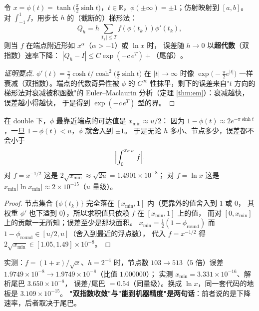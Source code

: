\begin{theorem}[双指数变换]
\label{thm:de}
令 $x=\phi(t)=\tanh\bigl(\tfrac\pi2\sinh t\bigr)$，$t\in\mathbb{R}$，$\phi(\pm\infty)=\pm1$；仿射映射到 $[a,b]$。
对 $\int_{-1}^1f$，用步长 $h$ 的（截断的）梯形法：
\[
  Q_h=h\sum_{|t_k|\le T}f(\phi(t_k))\phi'(t_k),
\]
则当 $f$ 在端点附近形如 $x^\alpha$（$\alpha>-1$）或 $\ln x$ 时，
误差随 $h\to0$ 以\textbf{超代数}（双指数）速率下降：
$|Q_h-I|\le C\exp(-c\,e^{T})+\text{（尾部）}$。
\end{theorem}

\begin{proof}[证明要点]
$\phi'(t)=\tfrac\pi2\cosh t/\cosh^2\bigl(\tfrac\pi2\sinh t\bigr)$ 在 $|t|\to\infty$ 时像
$\exp\bigl(-\tfrac\pi2e^{|t|}\bigr)$ 一样衰减（双指数）。端点的代数奇异性被 $\phi$ 的
$C^\infty$ 性抹平，剩下的误差来自"$t$ 方向的梯形法对衰减被积函数"的
Euler–Maclaurin 分析（定理 \ref{thm:em}）：衰减越快，误差越小得越快，
于是得到 $\exp(-c\,e^{T})$ 型的界。
\end{proof}

\begin{theorem}[地板 = 没采到的面积]
\label{thm:floor}
在 double 下，$\phi$ 最靠近端点的可达值是 $x_{\min}\approx u/2$：
因为 $1-\phi(t)\approx2e^{-\pi\sinh t}$，一旦 $1-\phi(t)<u$，$\phi$ 就舍入到 $\pm1$。
于是无论 $h$ 多小、节点多少，误差都不会小于
\[
  \Bigl|\int_0^{x_{\min}}f\Bigr| .
\]
对 $f=x^{-1/2}$ 这是 $2\sqrt{x_{\min}}\approx\sqrt{2u}=1.4901\times10^{-8}$；
对 $f=\ln x$ 这是 $x_{\min}|\ln x_{\min}|\approx2\times10^{-15}$（$u$ 量级）。
\end{theorem}

\begin{proof}
节点集合 $\{\phi(t_k)\}$ 完全落在 $[x_{\min},1]$ 内（更靠外的值舍入到 $1$ 或 $0$，
其权重 $\phi'$ 也下溢到 $0$），所以求积值只依赖 $f$ 在 $[x_{\min},1]$ 上的值，
而对 $[0,x_{\min}]$ 上的贡献一无所知；误差至少是那块面积。
$x_{\min}=\tfrac12(1-\phi_{\text{round}})$ 而 $1-\phi_{\text{round}}\in[u/2,u]$（舍入到最近的浮点数），
代入 $f=x^{-1/2}$ 得 $2\sqrt{x_{\min}}\in[1.05,1.49]\times10^{-8}$。
\end{proof}

实测：$f=(1+x)/\sqrt x$、$h=2^{-4}$ 时，节点数 $103\to513$（$5$ 倍）误差
$1.9749\times10^{-8}\to1.9749\times10^{-8}$（比值 $1.000000$）；
实测 $x_{\min}=3.331\times10^{-16}$、解析尾巴 $3.650\times10^{-8}$，
误差/尾巴 $=0.54$（同量级）。换成 $\ln x$，同一套代码的地板是 $3.109\times10^{-15}$。
\textbf{"双指数收敛"与"能到机器精度"是两句话}：前者说的是下降速率，后者取决于尾巴。

